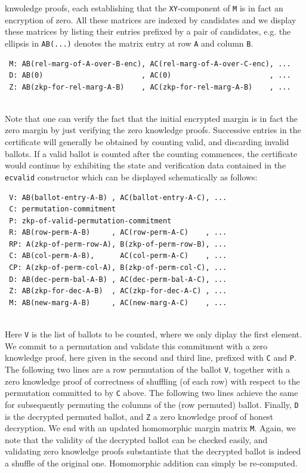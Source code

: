 \documentclass{llncs}
\begin{document}
 knwoledge proofs, each establishing that the \texttt{XY}-component
 of \texttt{M} is in fact an encryption of zero. All these matrices
 are indexed by candidates and we display these matrices by listing
 their entries prefixed by a pair of candidates, e.g. the ellipsis
 in \texttt{AB(...)} denotes the matrix entry at row \texttt{A} and
 column \texttt{B}.
 {\small
 \begin{verbatim}
 M: AB(rel-marg-of-A-over-B-enc), AC(rel-marg-of-A-over-C-enc), ... 
 D: AB(0)                       , AC(0)                       , ...
 Z: AB(zkp-for-rel-marg-A-B)    , AC(zkp-for-rel-marg-A-B)    , ...
 \end{verbatim}}
 \mbox{}\\[-5ex]
 Note that one can verify the fact that the initial encrypted margin
 is in fact the zero margin by just verifying the zero knowledge
 proofs. Successive entries in the certificate will generally be
 obtained by counting valid, and discarding invalid ballots. If a
 valid ballot is counted after the counting commences, the
 certificate would continue by exhibiting the state and verification
 data contained in the \texttt{ecvalid} constructor which can be
 displayed schematically as follows:
 {\small\begin{verbatim}
 V: AB(ballot-entry-A-B) , AC(ballot-entry-A-C), ...
 C: permutation-commitment
 P: zkp-of-valid-permutation-commitment
 R: AB(row-perm-A-B)     , AC(row-perm-A-C)    , ...
 RP: A(zkp-of-perm-row-A), B(zkp-of-perm-row-B), ... 
 C: AB(col-perm-A-B),      AC(col-perm-A-C)    , ...
 CP: A(zkp-of-perm-col-A), B(zkp-of-perm-col-C), ...
 D: AB(dec-perm-bal-A-B) , AC(dec-perm-bal-A-C), ...
 Z: AB(zkp-for-dec-A-B)  , AC(zkp-for-dec-A-C) , ...
 M: AB(new-marg-A-B)     , AC(new-marg-A-C)    , ...
 \end{verbatim}}
 \mbox{}\\[-5ex]
 Here \texttt{V} is the list of ballots to be counted, where we only
 diplay the first element. We
 commit to a permutation and validate this commitment with a zero
 knowledge proof, here given in the second and third line, prefixed
 with \texttt{C} and \texttt{P}. The following two lines are a row
 permutation of the ballot \texttt{V}, together with a zero
 knowledge proof of correctness of shuffling (of each row) with
 respect to the permutation committed to by \texttt{C} above. The
 following two lines achieve the same for subsequently permuting the
 columns of the (row permuted) ballot. Finally, \texttt{D} is the
 decrypted permuted ballot, and \texttt{Z} a zero knowledge proof of
 honest decryption. We end with an updated homomorphic margin
 matrix \texttt{M}. Again, we note that the validity of the
 decrypted ballot can be checked easily, and validating zero
 knowledge proofs substantiate that the decrypted ballot is indeed a
 shuffle of the original one. Homomorphic addition can simply be
 re-computed.
\end{document}
